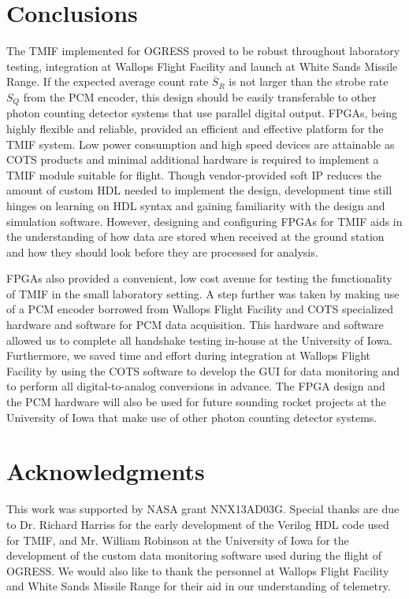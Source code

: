 \documentclass{ws-jai}
\begin{document}
\section{Conclusions}
\label{sect:conclusions}
The TMIF implemented for OGRESS proved to be robust throughout laboratory testing, integration at Wallops Flight Facility and launch at White Sands Missile Range. If the expected average count rate $\overline{S}_R$ is not larger than the strobe rate $S_Q$ from the PCM encoder, this design should be easily transferable to other photon counting detector systems that use parallel digital output. FPGAs, being highly flexible and reliable, provided an efficient and effective platform for the TMIF system. Low power consumption and high speed devices are attainable as COTS products and minimal additional hardware is required to implement a TMIF module suitable for flight. Though vendor-provided soft IP reduces the amount of custom HDL needed to implement the design, development time still hinges on learning on HDL syntax and gaining familiarity with the design and simulation software. However, designing and configuring FPGAs for TMIF aids in the understanding of how data are stored when received at the ground station and how they should look before they are processed for analysis.

FPGAs also provided a convenient, low cost avenue for testing the functionality of TMIF in the small laboratory setting. 
A step further was taken by making use of a PCM encoder borrowed from Wallops Flight Facility and COTS specialized hardware and software for PCM data acquisition. This hardware and software allowed us to complete all handshake testing in-house at the University of Iowa. Furthermore, we saved time and effort during integration at Wallops Flight Facility by using the COTS software to develop the GUI for data monitoring and to perform all digital-to-analog conversions in advance. 
The FPGA design and the PCM hardware will also be used for future sounding rocket projects at the University of Iowa that make use of other photon counting detector systems.

\section*{Acknowledgments}
This work was supported by NASA grant NNX13AD03G. Special thanks are due to Dr. Richard Harriss for the early development of the Verilog HDL code used for TMIF, and Mr. William Robinson at the University of Iowa for the development of the custom data monitoring software used during the flight of OGRESS. We would also like to thank the personnel at Wallops Flight Facility and White Sands Missile Range for their aid in our understanding of telemetry.




\end{document}
